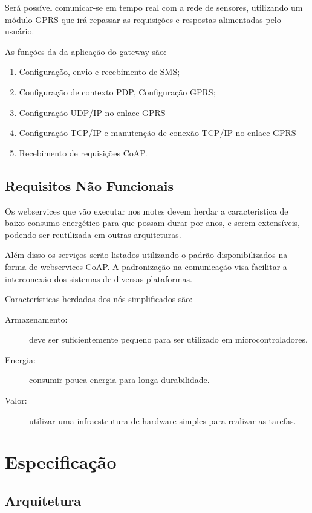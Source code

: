 Ser\'a poss\'ivel comunicar-se em tempo real com a rede de sensores, utilizando um m\'odulo GPRS que ir\'a repassar as requisi\c{c}\~oes e respostas alimentadas pelo usu\'ario.

As fun\c{c}\~oes da da aplica\c{c}\~ao do gateway s\~ao:
\begin{enumerate}
    \item Configura\c{c}\~ao, envio e recebimento de SMS;
    \item Configura\c{c}\~ao de contexto PDP, Configura\c{c}\~ao GPRS;
    \item Configura\c{c}\~ao UDP/IP no enlace GPRS
    \item Configura\c{c}\~ao TCP/IP e manuten\c{c}\~ao de conex\~ao TCP/IP no enlace GPRS
    \item Recebimento de requisi\c{c}\~oes CoAP.
\end{enumerate}

\subsection{Requisitos N\~ao Funcionais}

Os webservices que v\~ao executar nos motes devem herdar a caracteristica de baixo consumo energ\'etico para que possam durar por anos, e serem extens\'iveis, podendo ser reutilizada em outras arquiteturas.

Al\'em disso os servi\c{c}os ser\~ao listados utilizando o padr\~ao \cite{rfc6690} disponibilizados na forma de webservices CoAP. A padroniza\c{c}\~ao na comunica\c{c}\~ao visa facilitar a interconex\~ao dos sistemas de diversas plataformas.

Caracter\'isticas herdadas dos n\'os simplificados s\~ao:
\begin{description}
\item[Armazenamento:] deve ser suficientemente pequeno para ser utilizado em microcontroladores.
\item[Energia:] consumir pouca energia para longa durabilidade.
\item[Valor:] utilizar uma infraestrutura de hardware simples para realizar as tarefas.
\end{description}

\section{Especifica\c{c}\~ao}
\subsection{Arquitetura}

